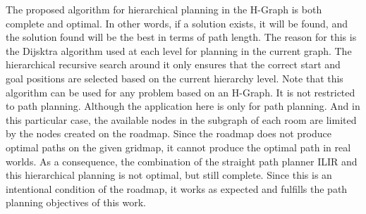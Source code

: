 The proposed algorithm for hierarchical planning in the H-Graph is both complete and optimal. In other words, if a solution exists, it will be found, and the solution found will be the best in terms of path length. The reason for this is the Dijsktra algorithm used at each level for planning in the current graph. The hierarchical recursive search around it only ensures that the correct start and goal positions are selected based on the current hierarchy level. Note that this algorithm can be used for any problem based on an H-Graph. It is not restricted to path planning. Although the application here is only for path planning. And in this particular case, the available nodes in the subgraph of each room are limited by the nodes created on the roadmap. Since the roadmap does not produce optimal paths on the given gridmap, it cannot produce the optimal path in real worlds. As a consequence, the combination of the straight path planner ILIR and this hierarchical planning is not optimal, but still complete. Since this is an intentional condition of the roadmap, it works as expected and fulfills the path planning objectives of this work.





